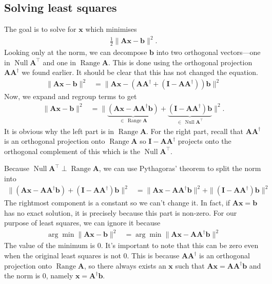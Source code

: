 \documentclass[12pt,a4paper]{article} %
\DeclareMathOperator{\Range}{Range}
\DeclareMathOperator{\Null}{Null}
\begin{document}
\newpage
\subsection{Solving least squares}
The goal is to solve for $\bm x$ which minimises
\begin{align*}
    \frac{1}{2}\| \mathbf A \bm x - \bm b \| ^2.
\end{align*}
Looking only at the norm, we can decompose $\bm b$ into two orthogonal vectors---one in $\Null \mathbf A^\top$ and one 
in $\Range \mathbf A$. This is done using the orthogonal projection $\mathbf A\mathbf A^\dagger$ we found earlier. 
It should be clear that this has not changed the equation. 
\begin{align*}
    \| \mathbf A \bm x - \bm b \| ^2 &= \| \mathbf A \bm x - (\mathbf A \mathbf A^\dagger + (\mathbf I - \mathbf A\mathbf A^\dagger))\bm b \|^2
\end{align*}
Now, we expand and regroup terms to get 
\begin{align*}
    \| \mathbf A \bm x - \bm b \| ^2 &= \| \underbrace{(\mathbf A \bm x - \mathbf A \mathbf A^\dagger \bm b)}_{\in \,\Range \mathbf A} + \underbrace{(\mathbf I - \mathbf A\mathbf A^\dagger)\bm b}_{\in \, \Null \mathbf A^\top} \|^2.
\end{align*}
It is obvious why the left part is in $\Range \mathbf A$. For the right part, recall that $\mathbf A \mathbf A^\dagger$ is an orthogonal projection onto $\Range \mathbf A$
so 
$\mathbf I - \mathbf A \mathbf A^\dagger$ projects onto the orthogonal complement of this which is the $\Null \mathbf A^\top$.

Because $\Null \mathbf A^\top \perp \Range \mathbf A$, we can use Pythagoras' theorem to split the norm into
\begin{align*}
    \| {(\mathbf A \bm x - \mathbf A \mathbf A^\dagger \bm b)} + {(\mathbf I - \mathbf A\mathbf A^\dagger)\bm b} \|^2
    &= \| {\mathbf A \bm x - \mathbf A \mathbf A^\dagger \bm b} \| ^2 + \| {(\mathbf I - \mathbf A\mathbf A^\dagger)\bm b}  \| ^2
\end{align*}
The rightmost component is a constant so we can't change it. 
In fact, if $\mathbf A \bm x = \bm b$ has no exact solution, 
it is precisely because this part is non-zero. For our purpose of least squares, we can ignore it because 
\begin{align*}
    \arg\min \| \mathbf A \bm x - \bm b \| ^2 &= \arg \min \| {\mathbf A \bm x - \mathbf A \mathbf A^\dagger \bm b} \| ^2
\end{align*}
The value of the minimum is 0. 
It's important to note that this can be zero even when 
the original least squares is not 0. This is because $\mathbf A \mathbf A^\dagger$ is an orthogonal projection onto 
$\Range \mathbf A$, so there always exists  an $\bm x$ such that $\mathbf A \bm x = \mathbf A \mathbf A^\dagger \bm b$ and the 
norm is 0, namely $\bm x = \mathbf A^\dagger \bm b$.
\end{document}
